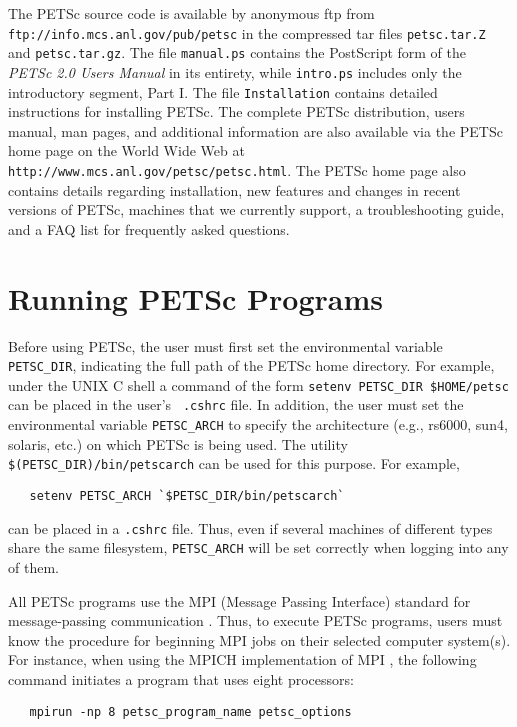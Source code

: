 The PETSc source code is available by anonymous ftp
from {\tt ftp://info.mcs.anl.gov/pub/petsc} in the compressed tar files
{\tt petsc.tar.Z} and {\tt petsc.tar.gz}.  
The file {\tt manual.ps} contains the PostScript form of
the {\em PETSc 2.0 Users Manual} in its entirety, while {\tt intro.ps} 
includes only the introductory segment, Part I.   
The file {\tt Installation} contains detailed instructions for
installing PETSc. The complete PETSc distribution, users
manual, man pages, and additional information are also available via
the PETSc home page on the World Wide Web at
{\tt http://www.mcs.anl.gov/petsc/petsc.html}.  The PETSc home page also
contains details regarding installation, new features and changes in recent
versions of PETSc, machines that we currently support, a
troubleshooting guide, and a FAQ list for frequently asked questions.

\section{Running PETSc Programs}
\label{sec:running}

Before using PETSc, the user must first set the environmental variable
{\tt PETSC\_DIR},  indicating the full path of the PETSc home
directory.  For example, under the UNIX C shell a command of the form
{\tt setenv PETSC\_DIR \$HOME/petsc} can be placed in the user's {\tt
.cshrc} file.  In addition, the user must set the environmental
variable {\tt PETSC\_ARCH} to specify the architecture (e.g., rs6000,
sun4, solaris, etc.)  on which PETSc is being used.  The utility {\tt
\$(PETSC\_DIR)/bin/petscarch} can be used for this purpose.  For example,
\begin{verbatim}
   setenv PETSC_ARCH `$PETSC_DIR/bin/petscarch`
\end{verbatim}
can be placed in a {\tt .cshrc} file.  Thus, even if several machines of different
types share the same filesystem, {\tt PETSC\_ARCH} will be set correctly
when logging into any of them. 

All PETSc programs use the MPI (Message Passing Interface) standard
for message-passing communication \cite{MPI-final}.  Thus, to execute
PETSc programs, users must know the procedure for beginning MPI jobs
on their selected computer system(s).  For instance, when using the
MPICH implementation of MPI \cite{mpich-web-page}, the following
command initiates a program that uses eight processors:
  
\begin{verbatim}
   mpirun -np 8 petsc_program_name petsc_options
\end{verbatim}


